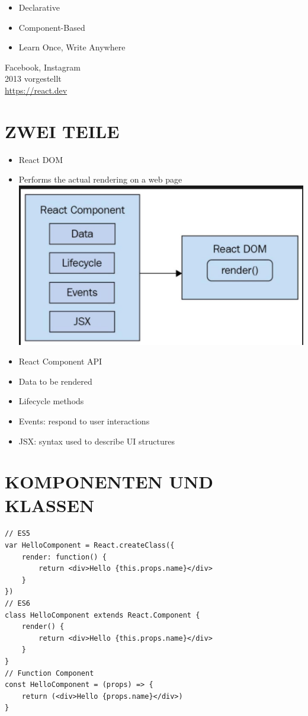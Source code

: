 \documentclass[10pt]{article}
\begin{document}
\begin{itemize}
  \item Declarative
  \item Component-Based
  \item Learn Once, Write Anywhere
\end{itemize}

Facebook, Instagram\\
2013 vorgestellt\\
\href{https://react.dev}{https://react.dev}

\section*{ZWEI TEILE}
\begin{itemize}
  \item React DOM
  \item Performs the actual rendering on a web page\\
\includegraphics[width=\linewidth]{images/2025_01_02_68113d8fd21152cab1dbg-06}
  \item React Component API
  \item Data to be rendered
  \item Lifecycle methods
  \item Events: respond to user interactions
  \item JSX: syntax used to describe UI structures
\end{itemize}

\section*{KOMPONENTEN UND KLASSEN}
\begin{verbatim}
// ES5
var HelloComponent = React.createClass({
    render: function() {
        return <div>Hello {this.props.name}</div>
    }
})
// ES6
class HelloComponent extends React.Component {
    render() {
        return <div>Hello {this.props.name}</div>
    }
}
// Function Component
const HelloComponent = (props) => {
    return (<div>Hello {props.name}</div>)
}
\end{verbatim}
\end{document}
